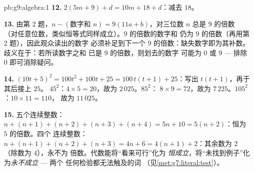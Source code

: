 \begin{solution}{pb:g9:algebra:1}
\textbf{12.} $2(5m + 9) + d = 10m + 18 + d$：减去 $18$。

\textbf{13.} 由第 2 题，$n - (\text{数字和 } n) =
9(11a + b)$，对三位数 $n$ 总是 $9$ 的倍数
（对任意位数，类似恒等式同样成立）。$9$ 的倍数的数字和
仍为 $9$ 的倍数（再用第 2 题），因此观众读出的数字
必须补足到下一个
$9$ 的倍数：缺失数字即为其补数。歧义在于：若所读数字之和
已是 $9$ 的倍数，则划去的数字
可能为 $0$ 或 $9$ --- 排除 $0$ 即可消除疑问。

\textbf{14.} $(10t + 5)^2 = 100t^2 + 100t + 25 =
100\,t(t + 1) + 25$：写出 $t(t+1)$，再于其后接上 $25$。
$45^2$：$4 \times 5 = 20$，故为 $2\,025$。$85^2$：
$8 \times 9 = 72$，故为 $7\,225$。$105^2$：$10 \times 11 = 110$，
故为 $11\,025$。

\textbf{15.} 五个连续整数：$n + (n+1) + (n+2) + (n+3) +
(n+4) = 5n + 10 = 5(n + 2)$：恒为 $5$ 的倍数。四个
连续整数：$n + (n+1) + (n+2) + (n+3) = 4n + 6 =
4(n + 1) + 2$：其余数为 $2$（除数为 $4$），永不为
倍数。代数能将“看来可行”化为
\emph{恒成立}，将“未找到例子”化为\emph{永不成立} --- 两个
任何检验都无法触及的词
（见\cref{met:g7:literal:test}）。
\end{solution}
